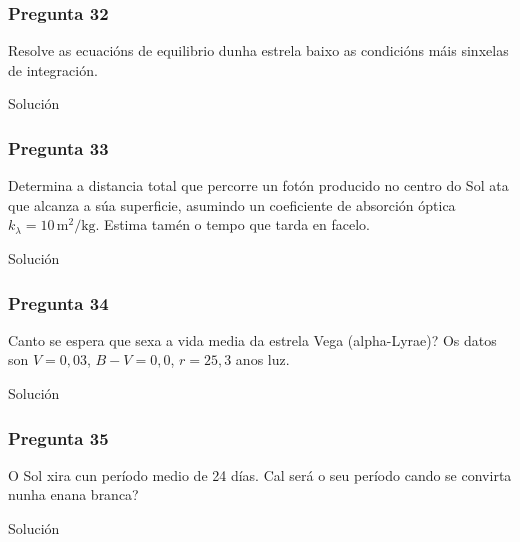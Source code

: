 \vspace*{2em}

\begin{Enunciado}
	\subsubsection{Pregunta 32}

	Resolve as ecuacións de equilibrio dunha estrela baixo as condicións máis sinxelas de integración.

\end{Enunciado}
Solución

\vspace*{2em}

\begin{Enunciado}
	\subsubsection{Pregunta 33}

	Determina a distancia total que percorre un fotón producido no centro do Sol ata que alcanza a súa superficie, asumindo un coeficiente de absorción óptica $k_\lambda = 10\,\text{m}^2/\text{kg}$. Estima tamén o tempo que tarda en facelo.

\end{Enunciado}
Solución

\vspace*{2em}

\begin{Enunciado}
	\subsubsection{Pregunta 34}

	Canto se espera que sexa a vida media da estrela Vega (alpha-Lyrae)? Os datos son $V = 0{,}03$, $B - V = 0{,}0$, $r = 25{,}3$ anos luz.

\end{Enunciado}
Solución

\vspace*{2em}

\begin{Enunciado}
	\subsubsection{Pregunta 35}

	O Sol xira cun período medio de 24 días. Cal será o seu período cando se convirta nunha enana branca?

\end{Enunciado}
Solución

